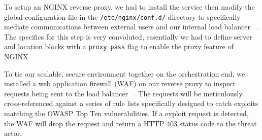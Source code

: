 To setup an NGINX reverse proxy, we had to install the service then modify the global configuration file in the \texttt{/etc/nginx/conf.d/} directory to specifically mediate communications between external users and our internal load balancer ~\cite{hostinger_nginx_proxy}. The specifics for this step is
very convoluted, essentially we had to define server and location blocks with a \texttt{proxy pass} flag to enable the proxy feature of NGINX.

To tie our scalable, secure environment together on the orchestration end, we installed a web application firewall (WAF) on our reverse proxy to inspect requests being sent to the load balancer ~\cite{linode_modsecurity}. The requests
will be meticulously cross-referenced against a series of rule lists specifically designed to catch exploits matching the OWASP Top Ten vulnerabilities. If a exploit request is detected, the WAF will drop the request and return
a HTTP 403 status code to the threat actor.